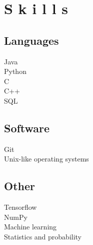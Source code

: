 \documentclass[]{deedy-resume-openfont}
\begin{document}
\begin{minipage}[t]{0.33\textwidth}

\section{S k i l l s}

\subsection{Languages}
\textbullet{} Java \\
\textbullet{} Python \\
\textbullet{} C \\
\textbullet{} C++ \\
\textbullet{} SQL \\

\subsection{Software}
\textbullet{} Git \\
\textbullet{} Unix-like operating systems \\

\subsection{Other}
\textbullet{} Tensorflow \\
\textbullet{} NumPy \\ 
\textbullet{} Machine learning \\
\textbullet{} Statistics and probability
\sectionsep

%
%

\end{minipage} 
\hfill
\end{document}
